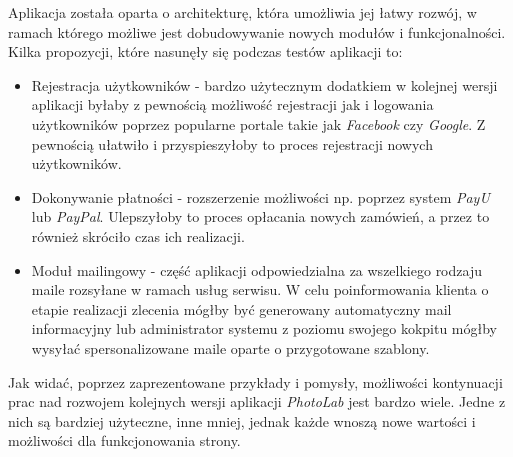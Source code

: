 \quad Aplikacja została oparta o architekturę, która umożliwia jej łatwy rozwój, w ramach którego możliwe jest dobudowywanie nowych modułów i funkcjonalności. Kilka propozycji, które nasunęły się podczas testów aplikacji to:
\begin{itemize}
    \item Rejestracja użytkowników - bardzo użytecznym dodatkiem w kolejnej wersji aplikacji byłaby z pewnością możliwość rejestracji jak i logowania użytkowników poprzez popularne portale takie jak \textit{Facebook} czy \textit{Google}. Z pewnością ułatwiło i przyspieszyłoby to proces rejestracji nowych użytkowników.
    \item Dokonywanie płatności - rozszerzenie możliwości np. poprzez system \textit{PayU} lub \textit{PayPal}. Ulepszyłoby to proces opłacania nowych zamówień, a przez to również skróciło czas ich realizacji.
    \item Moduł mailingowy - część aplikacji odpowiedzialna za wszelkiego rodzaju maile rozsyłane w ramach usług serwisu. W celu poinformowania klienta o etapie realizacji zlecenia mógłby być generowany automatyczny mail informacyjny lub administrator systemu z poziomu swojego kokpitu mógłby wysyłać spersonalizowane maile oparte o przygotowane szablony.
\end{itemize}
Jak widać, poprzez zaprezentowane przykłady i pomysły, możliwości kontynuacji prac nad rozwojem kolejnych wersji aplikacji \textit{PhotoLab} jest bardzo wiele. Jedne z nich są bardziej użyteczne, inne mniej, jednak każde wnoszą nowe wartości i możliwości dla funkcjonowania strony. 

